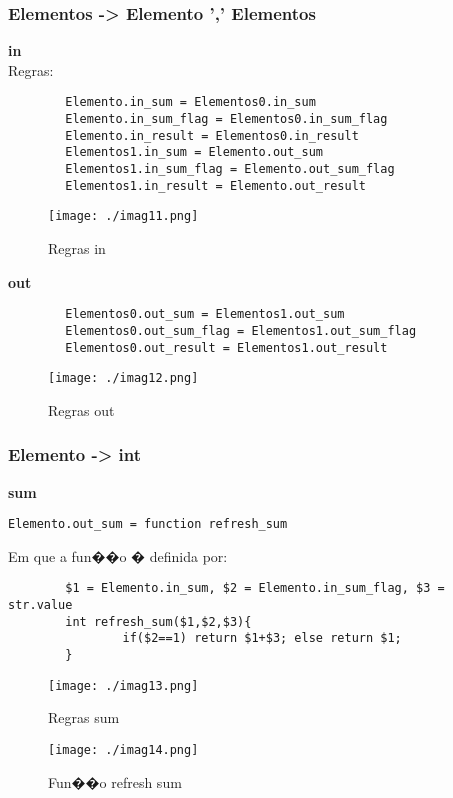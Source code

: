 \documentclass[a4paper]{article}
\begin{document}
\subsubsection{Elementos -> Elemento ',' Elementos}
\textbf{in}\\
Regras:
\begin{verbatim}
        Elemento.in_sum = Elementos0.in_sum
        Elemento.in_sum_flag = Elementos0.in_sum_flag
        Elemento.in_result = Elementos0.in_result
        Elementos1.in_sum = Elemento.out_sum
        Elementos1.in_sum_flag = Elemento.out_sum_flag
        Elementos1.in_result = Elemento.out_result
\end{verbatim}

\begin{figure}[H]
 \centering
 \texttt{[image: ./imag11.png]}
 \caption{Regras in}
\end{figure}

\textbf{out}\\
\begin{verbatim}
        Elementos0.out_sum = Elementos1.out_sum
        Elementos0.out_sum_flag = Elementos1.out_sum_flag
        Elementos0.out_result = Elementos1.out_result
\end{verbatim}
\begin{figure}[H]
 \centering
 \texttt{[image: ./imag12.png]}
 \caption{Regras out}
\end{figure}


\subsubsection{Elemento -> int}
\textbf{sum}\\
\begin{verbatim}
Elemento.out_sum = function refresh_sum 
\end{verbatim}
Em que a fun��o � definida por:
\begin{verbatim}
        $1 = Elemento.in_sum, $2 = Elemento.in_sum_flag, $3 = str.value
        int refresh_sum($1,$2,$3){
                if($2==1) return $1+$3; else return $1; 
        }
\end{verbatim}
\begin{figure}[H]
 \centering
 \texttt{[image: ./imag13.png]}
 \caption{Regras sum}
\end{figure}
\begin{figure}[H]
 \centering
 \texttt{[image: ./imag14.png]}
 \caption{Fun��o refresh sum}
\end{figure}
\end{document}
